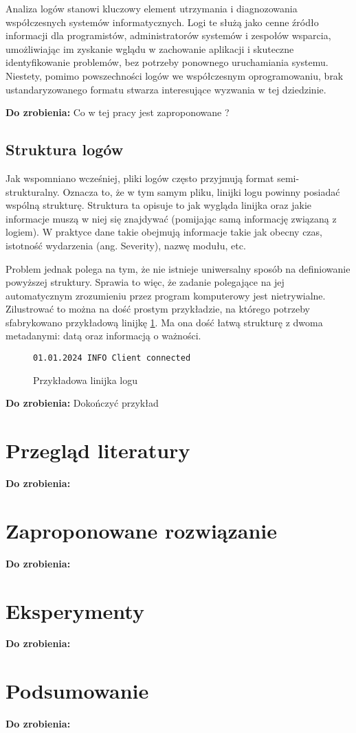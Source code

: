 \documentclass{pginz}
\newcommand{\todo}[1]{\textbf{Do zrobienia: } #1}
\begin{document}
Analiza logów stanowi kluczowy element utrzymania i diagnozowania współczesnych
systemów informatycznych. Logi te służą jako cenne źródło informacji dla
programistów, administratorów systemów i zespołów wsparcia, umożliwiając im
zyskanie wglądu w zachowanie aplikacji i skuteczne identyfikowanie problemów,
bez potrzeby ponownego uruchamiania systemu.
Niestety, pomimo powszechności logów we współczesnym oprogramowaniu, brak
ustandaryzowanego formatu stwarza interesujące wyzwania w tej dziedzinie.

\todo{Co w tej pracy jest zaproponowane ?}

\section{Struktura logów}
\label{sec:log-structure}

Jak wspomniano wcześniej, pliki logów często przyjmują format semi-strukturalny.
Oznacza to, że w tym samym pliku, linijki logu powinny posiadać wspólną
strukturę.
Struktura ta opisuje to jak wygląda linijka oraz jakie informacje muszą w niej
się znajdywać (pomijając samą informację związaną z logiem).
W praktyce dane takie obejmują informacje takie jak obecny czas, istotność
wydarzenia (ang. Severity), nazwę modułu, etc.

Problem jednak polega na tym, że nie istnieje uniwersalny sposób na definiowanie
powyższej struktury.
Sprawia to więc, że zadanie polegające na jej automatycznym zrozumieniu przez
program komputerowy jest nietrywialne.
Zilustrować to można na dość prostym przykładzie, na którego potrzeby
sfabrykowano przykładową linijkę \ref{code:sample-line-1}.
Ma ona dość łatwą strukturę z dwoma metadanymi: datą oraz informacją o ważności.

\begin{figure}[ht]
\begin{verbatim}
01.01.2024 INFO Client connected
\end{verbatim}
\caption{Przykładowa linijka logu}
\label{code:sample-line-1}
\end{figure}

\todo{Dokończyć przykład}

\chapter{Przegląd literatury}

\todo{}

\chapter{Zaproponowane rozwiązanie}

\todo{}

\chapter{Eksperymenty}

\todo{}

\chapter{Podsumowanie}

\todo{}

\listoffigures
{}
\listoftables
{}


\printbibliography[
    heading=bibintoc,
    title={Bibliografia}
]
\end{document}
